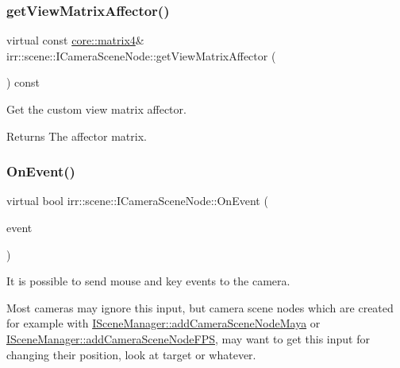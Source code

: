 \subsubsection{\texorpdfstring{get\+View\+Matrix\+Affector()}{getViewMatrixAffector()}}
{\footnotesize\ttfamily virtual const \hyperlink{namespaceirr_1_1core_a73fa92e638c5ca97efd72da307cc9b65}{core\+::matrix4}\& irr\+::scene\+::\+I\+Camera\+Scene\+Node\+::get\+View\+Matrix\+Affector (\begin{DoxyParamCaption}{ }\end{DoxyParamCaption}) const\hspace{0.3cm}{\ttfamily [pure virtual]}}



Get the custom view matrix affector. 

\begin{DoxyReturn}{Returns}
The affector matrix. 
\end{DoxyReturn}
\mbox{\label{classirr_1_1scene_1_1ICameraSceneNode_af27145518f43a17f803cdea086f68f3c}} 
\subsubsection{\texorpdfstring{On\+Event()}{OnEvent()}}
{\footnotesize\ttfamily virtual bool irr\+::scene\+::\+I\+Camera\+Scene\+Node\+::\+On\+Event (\begin{DoxyParamCaption}\item[{const \hyperlink{structirr_1_1SEvent}{S\+Event} \&}]{event }\end{DoxyParamCaption})\hspace{0.3cm}{\ttfamily [pure virtual]}}



It is possible to send mouse and key events to the camera. 

Most cameras may ignore this input, but camera scene nodes which are created for example with \hyperlink{classirr_1_1scene_1_1ISceneManager_a18e81a59e02231567ac938ea287fe523}{I\+Scene\+Manager\+::add\+Camera\+Scene\+Node\+Maya} or \hyperlink{classirr_1_1scene_1_1ISceneManager_ac312cbc85161678d00192880f2cdddbb}{I\+Scene\+Manager\+::add\+Camera\+Scene\+Node\+F\+PS}, may want to get this input for changing their position, look at target or whatever. 

